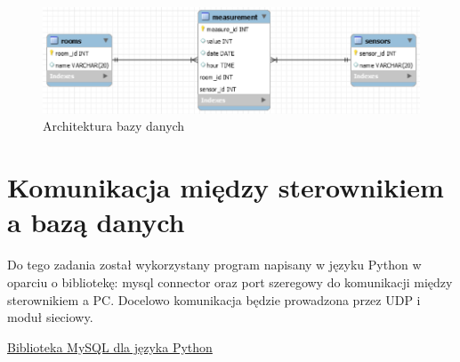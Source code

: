 \documentclass[10pt, a4paper]{article}
\begin{document}
\begin{figure}[H]
	\centering
	\includegraphics[width=1\textwidth]{figures/diag1.png}
	\caption{Architektura bazy danych}
	\label{fig:ArchitekturaBD2}
\end{figure}

\section{Komunikacja między sterownikiem a bazą danych}
Do tego zadania został wykorzystany program napisany w języku Python w oparciu o bibliotekę: mysql connector \cite{mysql} oraz port szeregowy do komunikacji między sterownikiem a PC. Docelowo komunikacja będzie prowadzona przez UDP i moduł sieciowy.

\begin{thebibliography}{9}
	
	\href{https://dev.mysql.com/doc/connector-python/en/}{Biblioteka MySQL dla języka Python}
	
\end{thebibliography}
\end{document}
